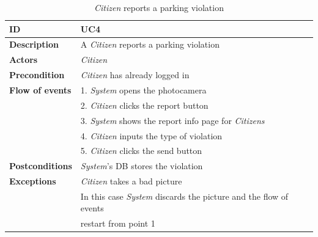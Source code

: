 \documentclass{article}
\begin{document}
\begin{table}
    \begin{center}
    \centering
\begin{tabular}{ | l | l |}
\hline
\textbf{ID} & UC4 \\
\hline
\textbf{Description} & A \textit{Citizen} reports a parking violation  \\
\hline
\textbf{Actors} & \textit{Citizen} \\
\hline
\textbf{Precondition} & \textit{Citizen} has already logged in \\
\hline
\textbf{Flow of events} & 1. \textit{System} opens the photocamera \\
                        & 2. \textit{Citizen} clicks the report button \\
                        & 3. \textit{System} shows the report info page for \textit{Citizens} \\
                        & 4. \textit{Citizen} inputs the type of violation \\
                        & 5. \textit{Citizen} clicks the send button \\
\hline
\textbf{Postconditions} & \textit{System}'s DB stores the violation  \\
\hline
\textbf{Exceptions} & \textit{Citizen} takes a bad picture \\
                    & In this case \textit{System} discards the picture and the flow of events  \\
                    & restart from point 1\\  
\hline
\end{tabular}
\caption{\textit{Citizen} reports a parking violation}
\end{center}
\end{table}
\end{document}

